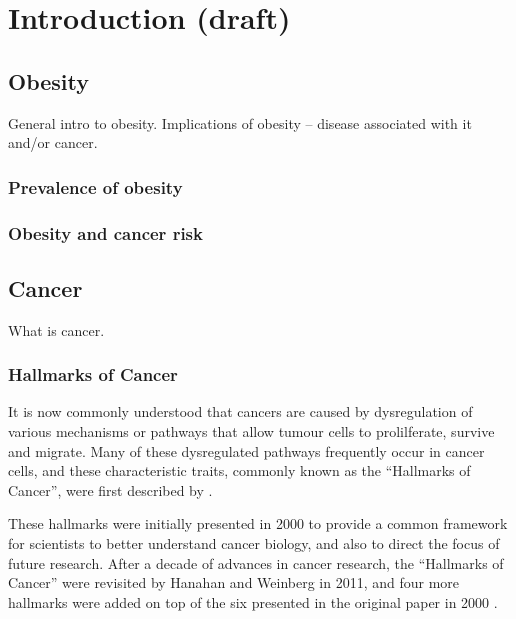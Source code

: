 \chapter{Introduction (draft)}
\label{ch:intro}


\section{Obesity}
\label{sec:obesity}

General intro to obesity.
Implications of obesity -- disease associated with it and/or cancer.

\subsection{Prevalence of obesity}
\label{sub:prevalence_of_obesity}



\subsection{Obesity and cancer risk}
\label{sub:obesity_and_cancer_risk}




\section{Cancer}
\label{sec:cancer}

What is cancer.

\subsection{Hallmarks of Cancer}
\label{subsec:cancerhallmarks}

It is now commonly understood that cancers are caused by dysregulation of various mechanisms or pathways that allow tumour cells to prolilferate, survive and migrate.
Many of these dysregulated pathways frequently occur in cancer cells, and these characteristic traits, commonly known as the ``Hallmarks of Cancer'', were first described by \citet{Hanahan2000}.

These hallmarks were initially presented in 2000 to provide a common framework for scientists to better understand cancer biology, and also to direct the focus of future research.
After a decade of advances in cancer research, the ``Hallmarks of Cancer'' were revisited by Hanahan and Weinberg in 2011, and four more hallmarks were added on top of the six presented in the original paper in 2000 \citep{Hanahan2011}.


